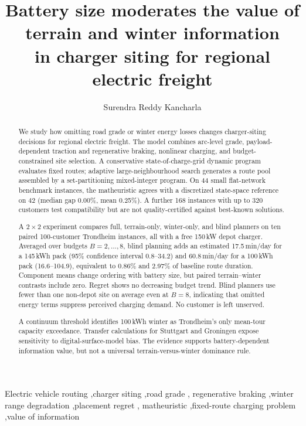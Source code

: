 \documentclass[review,3p,authoryear]{elsarticle}
\begin{document}
\begin{frontmatter}

\title{Battery size moderates the value of terrain and winter information\\
in charger siting for regional electric freight}

\author[trond]{Surendra Reddy Kancharla}

\address[trond]{[Affiliation -- to be completed]}

\begin{abstract}
We study how omitting road grade or winter energy losses changes
charger-siting decisions for regional electric freight.  The model combines
arc-level grade, payload-dependent traction and regenerative braking,
nonlinear charging, and budget-constrained site selection.  A conservative
state-of-charge-grid dynamic program evaluates fixed routes; adaptive
large-neighbourhood search generates a route pool assembled by a
set-partitioning mixed-integer program.  On 44 small flat-network benchmark
instances, the matheuristic agrees with a discretized state-space reference
on 42 (median gap 0.00\%, mean 0.25\%).  A further 168 instances with up to
320 customers test compatibility but are not quality-certified against
best-known solutions.

A $2\times2$ experiment compares full, terrain-only, winter-only, and blind
planners on ten paired 100-customer Trondheim instances, all with a free
150\,kW depot charger.  Averaged over budgets $B=2,\ldots,8$, blind planning
adds an estimated 17.5\,min/day for a 145\,kWh pack (95\% confidence interval
0.8--34.2) and 60.8\,min/day for a 100\,kWh pack (16.6--104.9), equivalent
to 0.86\% and 2.97\% of baseline route duration.  Component means change
ordering with battery size, but paired terrain--winter contrasts include
zero.  Regret shows no decreasing budget trend.  Blind planners use fewer
than one non-depot site on average even at $B=8$, indicating that omitted
energy terms suppress perceived charging demand.  No customer is left
unserved.

A continuum threshold identifies 100\,kWh winter as Trondheim's only
mean-tour capacity exceedance.  Transfer calculations for Stuttgart and
Groningen expose sensitivity to digital-surface-model bias.  The evidence
supports battery-dependent information value, but not a universal
terrain-versus-winter dominance rule.
\end{abstract}

\begin{keyword}
Electric vehicle routing \sep charger siting \sep road grade \sep
regenerative braking \sep winter range degradation \sep placement regret \sep
matheuristic \sep fixed-route charging problem \sep value of information
\end{keyword}

\end{frontmatter}
\end{document}
